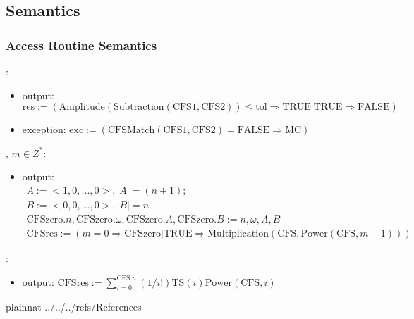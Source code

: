 \documentclass[12pt, titlepage]{article}
\begin{document}
\subsection{Semantics}


\subsubsection{Access Routine Semantics}

\noindent {}:
\begin{itemize}
\item output: $\text{res}:=(\text{Amplitude}(\text{Subtraction}(\text{CFS1}, \text{CFS2}))\le \text{tol}\Rightarrow \text{TRUE}|\text{TRUE}\Rightarrow\text{FALSE})$ 
\item exception: $\text{exc}:=(\text{CFSMatch}(\text{CFS1}, \text{CFS2})=\text{FALSE}\Rightarrow\text{MC})$ 
\end{itemize}

\noindent {}, $m\in Z^{*}$\li{)}:
\begin{itemize}
	\item output: 
	\begin{gather*}
	A:=<1, 0, ..., 0>, |A|=(n+1);\\ 
	B:=<0, 0, ..., 0>, |B|=n\\
	\text{CFSzero}.n, \text{CFSzero}.\omega, \text{CFSzero}.A, \text{CFSzero}.B:=n, \omega, A, B\\
	\text{CFSres}:=(m=0\Rightarrow \text{CFSzero}|\text{TRUE}\Rightarrow \text{Multiplication}(\text{CFS}, \text{Power}(\text{CFS}, m-1)))
	\end{gather*}
\end{itemize}

\noindent {}:
\begin{itemize}
	\item output: $\text{CFSres}:=\sum_{i=0}^{\text{CFS}.n}(1/i!)\text{TS}(i)\text{Power}(\text{CFS}, i)$
\end{itemize}

\newpage

 {plainnat}
 {../../../refs/References}

\newpage

\appendix

\end{document}
